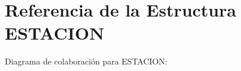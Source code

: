 \hypertarget{structESTACION}{}\section{Referencia de la Estructura E\+S\+T\+A\+C\+I\+ON}
\label{structESTACION}


Diagrama de colaboración para E\+S\+T\+A\+C\+I\+ON\+:
